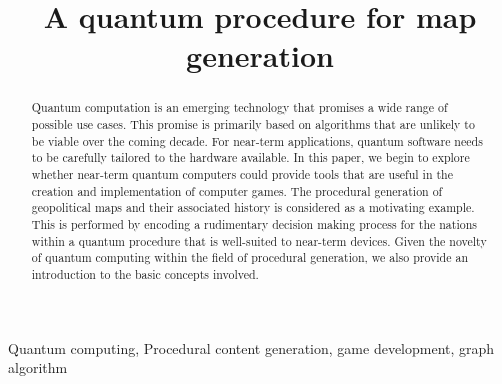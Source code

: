 \documentclass[conference]{IEEEtran}
\begin{document}
\title{A quantum procedure for map generation}



\author{
}


\maketitle

\begin{abstract}

Quantum computation is an emerging technology that promises a wide range of possible use cases. This promise is primarily based on algorithms that are unlikely to be viable over the coming decade. For near-term applications, quantum software needs to be carefully tailored to the hardware available. In this paper, we begin to explore whether near-term quantum computers could provide tools that are useful in the creation and implementation of computer games. The procedural generation of geopolitical maps and their associated history is considered as a motivating example. This is performed by encoding a rudimentary decision making process for the nations within a quantum procedure that is well-suited to near-term devices. Given the novelty of quantum computing within the field of procedural generation, we also provide an introduction to the basic concepts involved.

\end{abstract}

\begin{IEEEkeywords}
Quantum computing, Procedural content generation, game development, graph algorithm
\end{IEEEkeywords}

\end{document}
